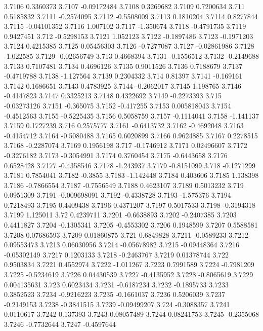 3.7106  0.3360373
3.7107  -0.09172484
3.7108  0.3269682
3.7109  0.7200634
3.711  0.5185832
3.7111  -0.2574095
3.7112  -0.5508009
3.7113  0.1810204
3.7114  0.8277844
3.7115  -0.04101352
3.7116  1.007102
3.7117  -1.350674
3.7118  -0.4791735
3.7119  0.9427451
3.712  -0.5298153
3.7121  1.052123
3.7122  -0.1897486
3.7123  -0.1971203
3.7124  0.4215385
3.7125  0.05456303
3.7126  -0.7277087
3.7127  -0.02861986
3.7128  -1.022585
3.7129  -0.02656749
3.713  0.4668394
3.7131  -0.1556512
3.7132  -0.2149688
3.7133  0.7107481
3.7134  0.4696126
3.7135  0.9011526
3.7136  0.7188679
3.7137  -0.4719788
3.7138  -1.127564
3.7139  0.2304332
3.714  0.81397
3.7141  -0.169161
3.7142  0.1686651
3.7143  0.4783925
3.7144  -0.2062017
3.7145  1.198765
3.7146  -0.4147823
3.7147  0.3325213
3.7148  0.4322692
3.7149  -0.2273393
3.715  -0.03273126
3.7151  -0.365075
3.7152  -0.417255
3.7153  0.005818043
3.7154  -0.4512563
3.7155  -0.5225435
3.7156  0.5058759
3.7157  -0.1114041
3.7158  -1.141137
3.7159  0.1727239
3.716  0.2575777
3.7161  -0.6413732
3.7162  -0.4692048
3.7163  -0.4154712
3.7164  -0.5080488
3.7165  0.6020899
3.7166  0.9624885
3.7167  0.2278515
3.7168  -0.2287074
3.7169  0.1956198
3.717  -0.1746912
3.7171  0.02496607
3.7172  -0.3276182
3.7173  -0.3054991
3.7174  0.3760454
3.7175  -0.6443658
3.7176  0.6528428
3.7177  -0.4358546
3.7178  -1.243937
3.7179  -0.8151099
3.718  -0.1271299
3.7181  0.7854041
3.7182  -0.3855
3.7183  -1.142448
3.7184  0.403606
3.7185  1.138398
3.7186  -0.7866554
3.7187  -0.7556549
3.7188  0.4623107
3.7189  0.5013232
3.719  0.0951309
3.7191  -0.009698091
3.7192  -0.4338728
3.7193  -1.575376
3.7194  0.7218493
3.7195  0.4409438
3.7196  0.4371207
3.7197  0.5017533
3.7198  -0.3194318
3.7199  1.125011
3.72  0.4239711
3.7201  -0.6638893
3.7202  -0.2407385
3.7203  0.4411827
3.7204  -0.1305341
3.7205  -0.4553302
3.7206  0.1948599
3.7207  0.5588581
3.7208  0.07686593
3.7209  0.01860875
3.721  0.6849828
3.7211  -0.0589233
3.7212  0.09553473
3.7213  0.06030956
3.7214  -0.05678982
3.7215  -0.09448364
3.7216  -0.05302149
3.7217  0.1203133
3.7218  -0.2463767
3.7219  0.01378744
3.722  0.9503834
3.7221  0.4552974
3.7222  -1.011267
3.7223  0.7991589
3.7224  -0.7981209
3.7225  -0.5234619
3.7226  0.04430539
3.7227  -0.4135952
3.7228  -0.8065619
3.7229  0.004135631
3.723  0.6023434
3.7231  -0.6187234
3.7232  -0.1895733
3.7233  0.3852523
3.7234  -0.9216223
3.7235  -0.1661037
3.7236  0.5206039
3.7237  -0.2149153
3.7238  -0.3841515
3.7239  -0.09499207
3.724  -0.3088357
3.7241  0.0110617
3.7242  0.137393
3.7243  0.08057489
3.7244  0.08241753
3.7245  -0.2355068
3.7246  -0.7732644
3.7247  -0.4597644
